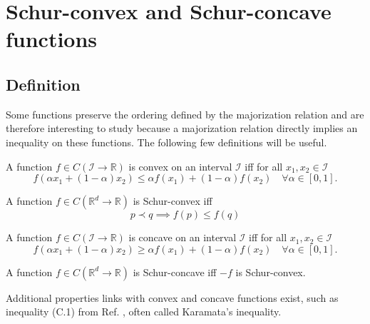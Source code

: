 \section{Schur-convex and Schur-concave functions}

\subsection{Definition}

Some functions preserve the ordering defined by the majorization relation and are therefore interesting to study because a majorization relation directly implies an inequality on these functions. The following few definitions will be useful.

\begin{definition}
    A function $f \in C(\mathcal{I} \to \mathbb{R})$ is convex on an interval $\mathcal{I}$ iff for all $x_1, x_2 \in \mathcal{I}$
    \begin{equation}
        f(\alpha x_1 + (1-\alpha) x_2) \leq \alpha f(x_1) + (1-\alpha) f(x_2) \quad \forall \alpha \in [0, 1].
    \end{equation}
\end{definition}

\begin{definition}
    A function $f \in C(\mathbb{R}^d \to \mathbb{R})$ is Schur-convex iff
    \begin{equation}
        p \prec q \implies f(p) \leq f(q)
    \end{equation}
\end{definition}

\begin{definition}
    A function $f \in C(\mathcal{I} \to \mathbb{R})$ is concave on an interval $\mathcal{I}$ iff for all $x_1, x_2 \in \mathcal{I}$
    \begin{equation}
        f(\alpha x_1 + (1-\alpha) x_2) \geq \alpha f(x_1) + (1-\alpha) f(x_2) \quad \forall \alpha \in [0, 1].
    \end{equation}
\end{definition}

\begin{definition}
    A function $f \in C(\mathbb{R}^d \to \mathbb{R})$ is Schur-concave iff $-f$ is Schur-convex.
\end{definition}

Additional properties links with convex and concave functions exist, such as inequality (C.1) from Ref. \cite[p. 92]{marshall_inequalities_2011}, often called Karamata's inequality.

